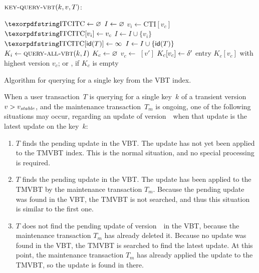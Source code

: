 \begin{algorithm}[htb]
$\proc{key-query-VBT}(k, v, T)$:

\begin{algorithmic}[1] 
\STATE $\textrm{\abbr{ITC}} \gets \emptymark$ 
\STATE $I \gets \varnothing$
  \STATE $v_i \gets \text{CTI}[v_c]$
  \STATE $\textrm{\abbr{ITC}}[v_i] \gets v_c$
  \STATE $I \gets I \cup \{ v_i \}$
\ENDFOR
{}
  \STATE $\textrm{\abbr{ITC}}[\txid{T}] \gets \infty$
  \STATE $I \gets I \cup \{ \text{\textsf{id}}(T) \}$
\ENDIF
\STATE $K_i \gets \proc{query-all-VBT}(k, I)$
\STATE $K_c \gets \varnothing$
  \STATE $v_c \gets$ $[v']$
  \STATE $K_c[v_c] \gets \delta'$
\ENDFOR
\RETURN entry $K_c[v_c]$ with highest version $v_c$; or \nullmark, if $K_c$
is empty
\end{algorithmic}
\caption{Algorithm for querying for a single key from the VBT index.}
\label{alg:key-query-vbt}
\end{algorithm}

When a user transaction~$T$ is querying for a single key~$k$ of a transient
version $v > \smash{v_{\text{\textit{stable}}}}$, and the maintenance transaction~$T_m$ is ongoing,
one of the following situations may occur, regarding an update of
version~\movever\ when that update is the latest update on the key~$k$:
\begin{enumerate}
\setlength{\itemsep}{0pt}

\item $T$ finds the pending update in the VBT\@.
The update has not yet been applied to the TMVBT index.
This is the normal situation, and no special processing is required.

\item $T$ finds the pending update in the VBT\@.
The update has been applied to the TMVBT by the maintenance
transaction $T_m$. 
Because the pending update was found in the VBT, the TMVBT is not
searched, and thus this situation is similar to the first one.

\item $T$ does not find the pending update of version~\movever\ in the
VBT, because the maintenance transaction $T_m$ has already deleted it. 
Because no update was found in the VBT, the TMVBT is searched to find
the latest update.
At this point, the maintenance transaction $T_m$ has already applied the
update to the TMVBT, so the update is found in there.
\end{enumerate}


